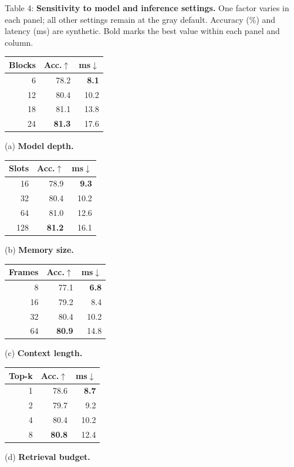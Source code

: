 \documentclass[10pt]{article}
\newcommand{\captext}[3]{\noindent Table #1: \textbf{#2} #3\par\vspace{5pt}}
\begin{document}
\captext{4}{Sensitivity to model and inference settings.}{One factor varies in each panel; all other settings remain at the gray default. Accuracy (\%) and latency (ms) are synthetic. Bold marks the best value within each panel and column.}
\vspace{3pt}
\begin{minipage}[t]{.24\linewidth}\centering\setlength{\tabcolsep}{3pt}
\begin{tabular}{@{}rrr@{}}\toprule
Blocks & Acc.$\uparrow$ & ms$\downarrow$ \\
\midrule
6 & 78.2 & \textbf{8.1} \\
\rowcolor{sectiongray}
12 & 80.4 & 10.2 \\
18 & 81.1 & 13.8 \\
24 & \textbf{81.3} & 17.6 \\
\bottomrule\end{tabular}\par\smallskip\raggedright (a) \textbf{Model depth.}\end{minipage}
\hfill
\begin{minipage}[t]{.24\linewidth}\centering\setlength{\tabcolsep}{3pt}
\begin{tabular}{@{}rrr@{}}\toprule
Slots & Acc.$\uparrow$ & ms$\downarrow$ \\
\midrule
16 & 78.9 & \textbf{9.3} \\
\rowcolor{sectiongray}
32 & 80.4 & 10.2 \\
64 & 81.0 & 12.6 \\
128 & \textbf{81.2} & 16.1 \\
\bottomrule\end{tabular}\par\smallskip\raggedright (b) \textbf{Memory size.}\end{minipage}
\hfill
\begin{minipage}[t]{.24\linewidth}\centering\setlength{\tabcolsep}{3pt}
\begin{tabular}{@{}rrr@{}}\toprule
Frames & Acc.$\uparrow$ & ms$\downarrow$ \\
\midrule
8 & 77.1 & \textbf{6.8} \\
16 & 79.2 & 8.4 \\
\rowcolor{sectiongray}
32 & 80.4 & 10.2 \\
64 & \textbf{80.9} & 14.8 \\
\bottomrule\end{tabular}\par\smallskip\raggedright (c) \textbf{Context length.}\end{minipage}
\hfill
\begin{minipage}[t]{.24\linewidth}\centering\setlength{\tabcolsep}{3pt}
\begin{tabular}{@{}rrr@{}}\toprule
Top-k & Acc.$\uparrow$ & ms$\downarrow$ \\
\midrule
1 & 78.6 & \textbf{8.7} \\
2 & 79.7 & 9.2 \\
\rowcolor{sectiongray}
4 & 80.4 & 10.2 \\
8 & \textbf{80.8} & 12.4 \\
\bottomrule\end{tabular}\par\smallskip\raggedright (d) \textbf{Retrieval budget.}\end{minipage}
\end{document}
